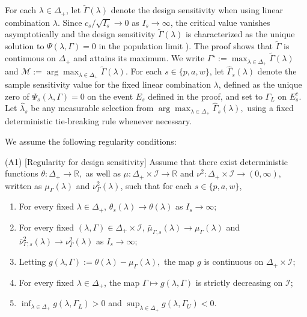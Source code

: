 \documentclass[12pt,leqno,titlepage]{amsart}
\newcommand{\1}{\mathbbm{1}}
\begin{document}
\begin{bibunit}
{For each \(\lambda\in\Delta_+\), let \(\widetilde\Gamma(\lambda)\) denote the design sensitivity when using linear combination \(\lambda\). Since $c_s/\sqrt{I_s}\to 0$ as $I_s\to\infty$, the critical value vanishes asymptotically and the design sensitivity $\widetilde\Gamma(\lambda)$ is characterized as the unique solution to $\Psi(\lambda,\Gamma)=0$ in the population limit \citep{rosenbaum2004design}). The proof shows that \(\widetilde\Gamma\) is continuous on \(\Delta_+\) and attains its maximum. We write
$
\Gamma^\star:=\max_{\lambda\in\Delta_+}\widetilde\Gamma(\lambda)
$
and
$
\mathcal M:=\arg\max_{\lambda\in\Delta_+}\widetilde\Gamma(\lambda).
$ For each \(s\in\{p,a,w\}\), let \(\widehat\Gamma_s(\lambda)\) denote the sample sensitivity value for the fixed linear combination \(\lambda\), defined as the unique zero of
$
\Psi_s(\lambda,\Gamma)=0
$
on the event $E_s$ defined in the proof, and set to $\Gamma_L$ on $E_s^c$. Let \(\widehat\lambda_s\) be any measurable selection from
$
\arg\max_{\lambda\in\Delta_+}\widehat\Gamma_s(\lambda),
$
using a fixed deterministic tie-breaking rule whenever necessary.



We assume the following regularity conditions:

\noindent\textup{(A1)} {[Regularity for design sensitivity]}
Assume that there exist deterministic functions
$
\theta:\Delta_+\to\mathbb R,
$ as well as $
\mu:\Delta_+\times\mathcal I\to\mathbb R
$ and $
\nu^2:\Delta_+\times\mathcal I\to(0,\infty),
$
written as \(\mu_\Gamma(\lambda)\) and \(\nu_\Gamma^2(\lambda)\), such that for each \(s\in\{p,a,w\}\),
\begin{enumerate}[label=(\roman*)]
\item For every fixed \(\lambda\in\Delta_+\),
$
\theta_s(\lambda)\to\theta(\lambda)
$ as $I_s\to\infty;
$
\item For every fixed \((\lambda,\Gamma)\in\Delta_+\times\mathcal I\),
$
\bar\mu_{\Gamma,s}(\lambda)\to\mu_\Gamma(\lambda)
$ and $
\bar\nu_{\Gamma,s}^2(\lambda)\to\nu_\Gamma^2(\lambda)
$ as $I_s\to\infty;
$
\item Letting
$
g(\lambda,\Gamma):=\theta(\lambda)-\mu_\Gamma(\lambda),
$
the map \(g\) is continuous on \(\Delta_+\times\mathcal I\);
\item For every fixed \(\lambda\in\Delta_+\), the map
$
\Gamma\mapsto g(\lambda,\Gamma)
$
is strictly decreasing on \(\mathcal I\);


\item
$
\inf_{\lambda\in\Delta_+} g(\lambda,\Gamma_L)>0
$ and $
\sup_{\lambda\in\Delta_+} g(\lambda,\Gamma_U)<0.
$
\end{enumerate}

}
\end{bibunit}
\end{document}
